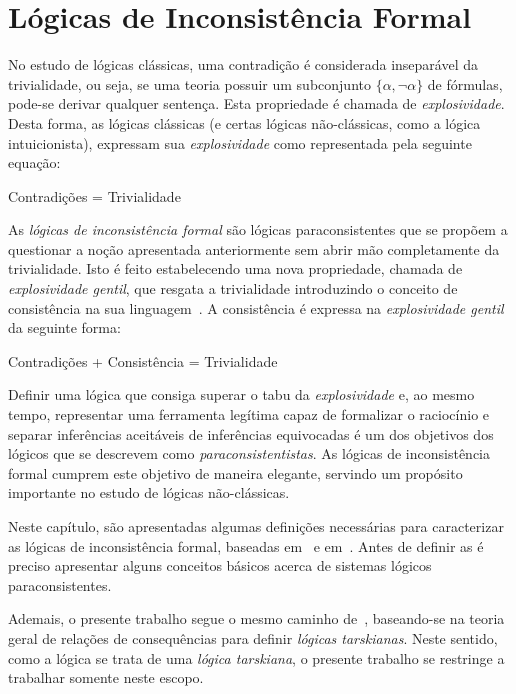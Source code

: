 \chapter{Lógicas de Inconsistência Formal}\label{cap:LFIs}
No estudo de lógicas clássicas, uma contradição é considerada inseparável da trivialidade, ou seja, se uma teoria possuir um subconjunto $\{\alpha,\neg \alpha\}$ de fórmulas, pode-se derivar qualquer sentença. Esta propriedade é chamada de \textit{explosividade}. Desta forma, as lógicas clássicas (e certas lógicas não-clássicas, como a lógica intuicionista), expressam sua \textit{explosividade} como representada pela seguinte equação:
\begin{center}
    Contradições = Trivialidade
\end{center}
As \textit{lógicas de inconsistência formal} são lógicas paraconsistentes que se propõem a questionar a noção apresentada anteriormente sem abrir mão completamente da trivialidade. Isto é feito estabelecendo uma nova propriedade, chamada de \textit{explosividade gentil}, que resgata a trivialidade introduzindo o conceito de consistência na sua linguagem~\cite{carnielli2007}. A consistência é expressa na \textit{explosividade gentil} da seguinte forma:
\begin{center}
    Contradições + Consistência = Trivialidade
\end{center}
Definir uma lógica que consiga superar o tabu da \textit{explosividade} e, ao mesmo tempo, representar uma ferramenta legítima capaz de formalizar o raciocínio e separar inferências aceitáveis de inferências equivocadas é um dos objetivos dos lógicos que se descrevem como \textit{paraconsistentistas}. As lógicas de inconsistência formal cumprem este objetivo de maneira elegante, servindo um propósito importante no estudo de lógicas não-clássicas.

Neste capítulo, são apresentadas algumas definições necessárias para caracterizar as lógicas de inconsistência formal, baseadas em~ e em~. Antes de definir as \lfis{} é preciso apresentar alguns conceitos básicos acerca de sistemas lógicos paraconsistentes.

Ademais, o presente trabalho segue o mesmo caminho de~, baseando-se na teoria geral de relações de consequências para definir \textit{lógicas tarskianas}. Neste sentido, como a lógica \lfium{} se trata de uma \textit{lógica tarskiana}, o presente trabalho se restringe a trabalhar somente neste escopo. 

